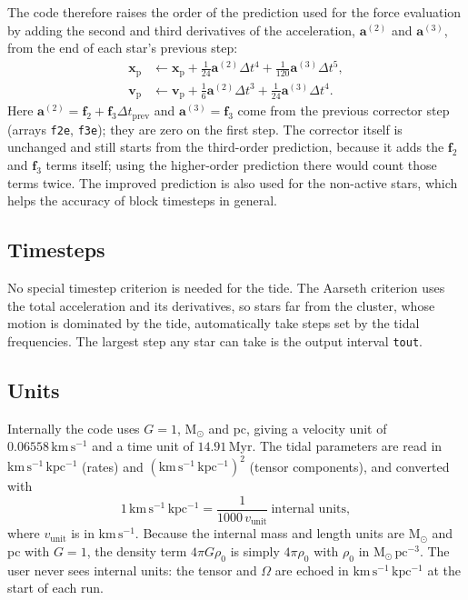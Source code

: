 \documentclass[11pt,a4paper]{article}
\newcommand{\bx}{\mathbf{x}}
\newcommand{\bv}{\mathbf{v}}
\newcommand{\ba}{\mathbf{a}}
\newcommand{\kmskpc}{\mathrm{km\,s^{-1}\,kpc^{-1}}}
\begin{document}
The code therefore raises the order of the prediction used for the
force evaluation by adding the second and third derivatives of the
acceleration, $\ba^{(2)}$ and $\ba^{(3)}$, from the end of each star's
previous step:
\begin{align}
  \bx_{\mathrm p} &\leftarrow \bx_{\mathrm p}
     + \tfrac1{24}\ba^{(2)}\Delta t^4 + \tfrac1{120}\ba^{(3)}\Delta t^5, \\
  \bv_{\mathrm p} &\leftarrow \bv_{\mathrm p}
     + \tfrac16\ba^{(2)}\Delta t^3 + \tfrac1{24}\ba^{(3)}\Delta t^4 .
\end{align}
Here $\ba^{(2)} = \mathbf{f}_2 + \mathbf{f}_3\Delta t_{\mathrm{prev}}$
and $\ba^{(3)} = \mathbf{f}_3$ come from the previous corrector step
(arrays \texttt{f2e}, \texttt{f3e}); they are zero on the first step.
The corrector itself is unchanged and still starts from the
third-order prediction, because it adds the $\mathbf f_2$ and
$\mathbf f_3$ terms itself; using the higher-order prediction there
would count those terms twice. The improved prediction is also used
for the non-active stars, which helps the accuracy of block timesteps
in general.

\subsection{Timesteps}
No special timestep criterion is needed for the tide. The Aarseth
criterion uses the total acceleration and its derivatives, so stars far
from the cluster, whose motion is dominated by the tide, automatically
take steps set by the tidal frequencies. The largest step any star can
take is the output interval \texttt{tout}.

\subsection{Units}
Internally the code uses $G=1$, $\mathrm{M_\odot}$ and pc, giving a
velocity unit of $0.06558\,\mathrm{km\,s^{-1}}$ and a time unit of
$14.91$\,Myr. The tidal parameters are read in $\kmskpc$ (rates) and
$(\kmskpc)^2$ (tensor components), and converted with
\begin{equation}
  1\,\kmskpc = \frac{1}{1000\,v_{\mathrm{unit}}}
  \ \text{internal units} ,
\end{equation}
where $v_{\mathrm{unit}}$ is in $\mathrm{km\,s^{-1}}$. Because the
internal mass and length units are $\mathrm{M_\odot}$ and pc with
$G=1$, the density term $4\pi G\rho_0$ is simply $4\pi\rho_0$ with
$\rho_0$ in $\mathrm{M_\odot\,pc^{-3}}$. The user never sees internal
units: the tensor and $\Omega$ are echoed in $\kmskpc$ at the start of
each run.
\end{document}
